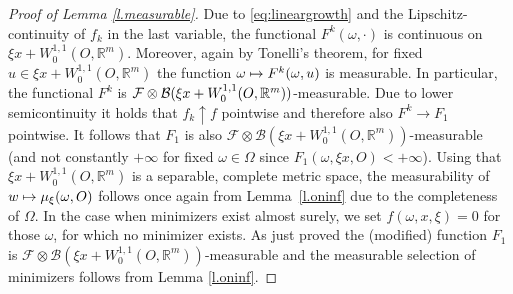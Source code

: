 \documentclass[JEP,XML,SOM,Unicode,published]{cedram}
\def\mto{\mathchoice{\longmapsto}{\mapsto}{\mapsto}{\mapsto}}
\theoremstyle{definition}
\let\w\omega
\newcommand{\R}{\mathbb{R}}
\begin{document}
\begin{proof}[Proof of Lemma \ref{l.measurable}]
Due to \eqref{eq:lineargrowth} and the Lipschitz-continuity of $f_k$ in the last variable, the functional $F^k(\w,\cdot)$ is continuous on $\xi x+W_0^{1,1}(O,\R^m)$. Moreover, again by Tonelli's theorem, for fixed $u\in\xi x+W^{1,1}_0(O,\R^m)$ the function $\w\mto F^k(\w,u)$ is measurable. In particular, the functional $F^k$ is $\mathcal{F}\otimes\nobreak\mathcal{B}(\xi x+W^{1,1}_0(O,\R^m))$-measurable. Due to lower semicontinuity it holds that $f_k\uparrow f$ pointwise and therefore also $F^k\to F_1$ pointwise. It follows that $F_1$ is also $\mathcal{F}\otimes\mathcal{B}(\xi x+W^{1,1}_0(O,\R^m))$-measurable (and not constantly $+\infty$ for fixed $\w\in\Omega$ since $F_1(\w,\xi x,O)<+\infty$). Using that $\xi x+W_0^{1,1}(O,\R^m)$ is a separable, complete metric space, the measurability of $w\mto\mu_{\xi}(\w,O)$ follows once again from Lemma~\ref{l.oninf} due to the completeness of $\Omega$. In the case when minimizers exist almost surely, we set $f(\w,x,\xi)=0$ for those $\w$, for which no minimizer exists. As just proved the (modified) function $F_1$ is $\mathcal{F}\otimes\mathcal{B}(\xi x+W^{1,1}_0(O,\R^m))$-measurable and the measurable selection of minimizers follows from Lemma \ref{l.oninf}.
\end{proof}




\end{document}
